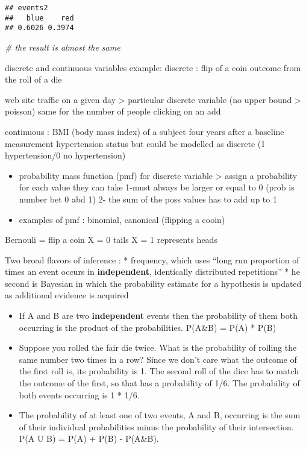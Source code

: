 \documentclass[
]{book}
\newenvironment{Shaded}{\begin{snugshade}}{\end{snugshade}}
\newcommand{\CommentTok}[1]{\textcolor[rgb]{0.56,0.35,0.01}{\textit{#1}}}
\begin{document}
\begin{verbatim}
## events2
##   blue    red 
## 0.6026 0.3974
\end{verbatim}

\begin{Shaded}
\begin{Highlighting}[]
\CommentTok{\# the result is almost the same}
\end{Highlighting}
\end{Shaded}

discrete and continuous variables
example:
discrete : flip of a coin
outcome from the roll of a die

web site traffic on a given day \textgreater{} particular discrete variable (no upper bound \textgreater{} poisson)
same for the number of people clicking on an add

continuous :
BMI (body mass index) of a subject four years after a baseline measurement
hypertension status but could be modelled as discrete (1 hypertension/0 no hypertension)

\begin{itemize}
\item
  probability mass function (pmf)
  for discrete variable \textgreater{} assign a probability for each value they can take
  1-must always be larger or equal to 0
  (prob is number bet 0 abd 1)
  2- the sum of the poss values has to add up to 1
\item
  examples of pmf :
  binomial, canonical (flipping a cooin)
\end{itemize}

Bernouli = flip a coin
X = 0 tails
X = 1 represents heads

Two broad flavors of inference :
* frequency, which uses ``long run proportion of times an event occurs in \textbf{independent}, identically distributed repetitions''
* he second is Bayesian in which the probability estimate for a hypothesis is updated as additional evidence is acquired

\begin{itemize}
\item
  If A and B are two \textbf{independent} events then the probability of them both occurring is the product of the probabilities. P(A\&B) = P(A) * P(B)
\item
  Suppose you rolled the fair die twice. What is the probability of rolling the same number two times in a row? Since we don't care what the outcome of the first roll is, its probability is 1. The second roll of the dice has to match the outcome of the first, so that has a probability of 1/6. The probability of both events occurring is 1 * 1/6.
\item
  The probability of at least one of two events, A and B, occurring is the sum of their individual
  probabilities minus the probability of their intersection. P(A U B) = P(A) + P(B) - P(A\&B).
\end{itemize}
\end{document}
